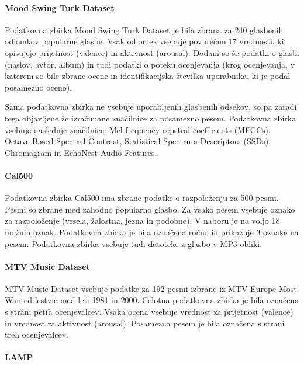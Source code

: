 \documentclass[a4paper, 12pt]{book}
\begin{document}
{\paragraph{Mood Swing Turk Dataset}

Podatkovna zbirka Mood Swing Turk Dataset \cite{schmidt2011modeling} je bila zbrana za 240 glasbenih odlomkov popularne glasbe. Vsak odlomek vsebuje povprečno 17 vrednosti, ki opisujejo prijetnost (valence) in aktivnost (arousal). Dodani so še podatki o glasbi (naslov, avtor, album) in tudi podatki o poteku ocenjevanja (krog ocenjevanja, v katerem so bile zbrane ocene in identifikacijska številka uporabnika, ki je podal posamezno oceno). 

Sama podatkovna zbirka ne vsebuje uporabljenih glasbenih odsekov, so pa zaradi tega objavljene že izračunane značilnice za posamezno pesem. Podatkovna zbirka vsebuje naslednje značilnice: Mel-frequency cepstral coefficients (MFCCs), Octave-Based Spectral Contrast, Statistical Spectrum Descriptors (SSDs), Chromagram in EchoNest Audio Features.

\paragraph{Cal500}

Podatkovna zbirka Cal500 \cite{turnbull2008semantic} ima zbrane podatke o razpoloženju za 500 pesmi. Pesmi so zbrane med zahodno popularno glasbo. Za vsako pesem vsebuje oznako za razpoloženje (vesela, žalostna, jezna in podobne). V naboru je na voljo 18 možnih oznak. Podatkovna zbirka je bila označena ročno in prikazuje 3 oznake na pesem. Podatkovna zbirka vsebuje tudi datoteke z glasbo v MP3 obliki.

\paragraph{MTV Music Dataset}

MTV Music Dataset \cite{schuller2010mister} vsebuje podatke za 192 pesmi izbrane iz MTV Europe Most Wanted lestvic med leti 1981 in 2000. Celotna podatkovna zbirka je bila označena s strani petih ocenjevalcev. Vsaka ocena vsebuje vrednost za prijetnost (valence) in vrednost za aktivnost (arousal). Posamezna pesem je bila označena s strani treh ocenjevalcev.

\paragraph{LAMP}

}
\end{document}
